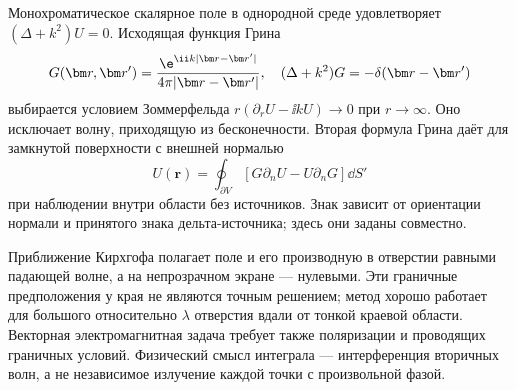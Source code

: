 
Монохроматическое скалярное поле в однородной среде удовлетворяет $(\Delta+k^2)U=0$. Исходящая функция Грина
\begin{equation}
 G(\bm r,\bm r')=\frac{\e^{\ii k|\bm r-\bm r'|}}{4\pi|\bm r-\bm r'|},
 \quad (\Delta+k^2)G=-\delta(\bm r-\bm r')
\end{equation}
выбирается условием Зоммерфельда $r(\partial_rU-\ii kU)\to0$ при $r\to\infty$. Оно исключает волну, приходящую из бесконечности. Вторая формула Грина даёт для замкнутой поверхности с внешней нормалью
\begin{equation}
 U(\bm r)=\oint_{\partial V}\left[G\partial_nU-U\partial_nG\right]\dd S'
\end{equation}
при наблюдении внутри области без источников. Знак зависит от ориентации нормали и принятого знака дельта-источника; здесь они заданы совместно.

Приближение Кирхгофа полагает поле и его производную в отверстии равными падающей волне, а на непрозрачном экране — нулевыми. Эти граничные предположения у края не являются точным решением; метод хорошо работает для большого относительно $\lambda$ отверстия вдали от тонкой краевой области. Векторная электромагнитная задача требует также поляризации и проводящих граничных условий. Физический смысл интеграла — интерференция вторичных волн, а не независимое излучение каждой точки с произвольной фазой.
